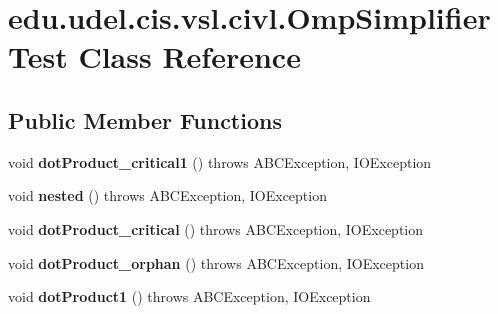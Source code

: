 \hypertarget{classedu_1_1udel_1_1cis_1_1vsl_1_1civl_1_1OmpSimplifierTest}{}\section{edu.\+udel.\+cis.\+vsl.\+civl.\+Omp\+Simplifier\+Test Class Reference}
\label{classedu_1_1udel_1_1cis_1_1vsl_1_1civl_1_1OmpSimplifierTest}
\subsection*{Public Member Functions}
\begin{DoxyCompactItemize}
\item 
\hypertarget{classedu_1_1udel_1_1cis_1_1vsl_1_1civl_1_1OmpSimplifierTest_aa196614daa592dba3c80d2261129190f}{}void {\bfseries dot\+Product\+\_\+critical1} ()  throws A\+B\+C\+Exception, I\+O\+Exception \label{classedu_1_1udel_1_1cis_1_1vsl_1_1civl_1_1OmpSimplifierTest_aa196614daa592dba3c80d2261129190f}

\item 
\hypertarget{classedu_1_1udel_1_1cis_1_1vsl_1_1civl_1_1OmpSimplifierTest_a62a1185e9c889126eba4a9a883211460}{}void {\bfseries nested} ()  throws A\+B\+C\+Exception, I\+O\+Exception \label{classedu_1_1udel_1_1cis_1_1vsl_1_1civl_1_1OmpSimplifierTest_a62a1185e9c889126eba4a9a883211460}

\item 
\hypertarget{classedu_1_1udel_1_1cis_1_1vsl_1_1civl_1_1OmpSimplifierTest_ad21fd1e9a4fd51a40d11701361b2d4c5}{}void {\bfseries dot\+Product\+\_\+critical} ()  throws A\+B\+C\+Exception, I\+O\+Exception \label{classedu_1_1udel_1_1cis_1_1vsl_1_1civl_1_1OmpSimplifierTest_ad21fd1e9a4fd51a40d11701361b2d4c5}

\item 
\hypertarget{classedu_1_1udel_1_1cis_1_1vsl_1_1civl_1_1OmpSimplifierTest_abccb9a0b3c911b65cb824432627feb82}{}void {\bfseries dot\+Product\+\_\+orphan} ()  throws A\+B\+C\+Exception, I\+O\+Exception \label{classedu_1_1udel_1_1cis_1_1vsl_1_1civl_1_1OmpSimplifierTest_abccb9a0b3c911b65cb824432627feb82}

\item 
\hypertarget{classedu_1_1udel_1_1cis_1_1vsl_1_1civl_1_1OmpSimplifierTest_aa16c10d21d969c1cb519a14299958289}{}void {\bfseries dot\+Product1} ()  throws A\+B\+C\+Exception, I\+O\+Exception \label{classedu_1_1udel_1_1cis_1_1vsl_1_1civl_1_1OmpSimplifierTest_aa16c10d21d969c1cb519a14299958289}


\end{DoxyCompactItemize}
